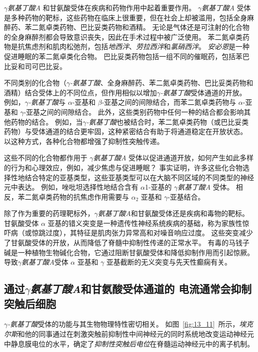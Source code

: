 \textit{$\gamma$氨基丁酸A} 和甘氨酸受体在疾病和药物作用中起着重要作用。
\textit{$\gamma$氨基丁酸A} 受体是多种药物的靶标，这些药物在临床上很重要，但在社会上却被滥用，包括全身麻醉药、苯二氮卓类药物、巴比妥类药物和酒精。
无论是气体还是可注射的化合物的全身麻醉剂都会导致意识丧失，因此在手术过程中被广泛使用。
苯二氮卓类药物是抗焦虑剂和肌肉松弛剂，包括\textit{地西泮}、\textit{劳拉西泮}和\textit{氯硝西泮}。
\textit{安必恩}是一种促进睡眠的苯二氮卓类化合物。
巴比妥类药物包括一组不同的催眠药，包括苯巴比妥和司可巴比妥。


不同类别的化合物（\textit{$\gamma$-氨基丁酸}、全身麻醉药、苯二氮卓类药物、巴比妥类药物和酒精）结合受体上的不同位点，但作用相似以增加\textit{$\gamma$-氨基丁酸}受体通道的开放。
例如，\textit{$\gamma$-氨基丁酸}与 $\alpha$-亚基和 $\beta$-亚基之间的间隙结合，而苯二氮卓类药物与 $\alpha$-亚基和 $\gamma$-亚基之间的间隙结合。
此外，这些类别药物中任何一种的结合都会影响其他药物的结合。
例如，当\textit{$\gamma$-氨基丁酸}也被结合时，苯二氮卓类药物（或巴比妥类药物）与受体通道的结合更牢固，这种紧密结合有助于将通道稳定在开放状态。
以这种方式，各种化合物都增强了抑制性突触传递。


这些不同的化合物都作用于 \textit{$\gamma$氨基丁酸A} 受体以促进通道开放，如何产生如此多样的行为和心理效应，例如，减少焦虑与促进睡眠？
事实证明，许多这些化合物选择性地结合特定的亚基类型，这些亚基类型可以在大脑不同区域的不同类型的神经元中表达。
例如，唑吡坦选择性地结合含有 $\alpha$1-亚基的 \textit{$\gamma$氨基丁酸A} 受体。
相反，苯二氮卓类药物的抗焦虑作用需要与 $\alpha_2$ 亚基和 $\gamma$-亚基结合。


除了作为重要的药理靶标外，\textit{$\gamma$氨基丁酸A}和甘氨酸受体还是疾病和毒物的靶标。
甘氨酸受体 $\alpha$ 亚基的错义突变是一种遗传性神经系统疾病的基础，称为家族性惊吓病（或惊跳过度），其特征是肌肉张力异常高和对噪音响应过度。
这些突变减少了甘氨酸受体的开放，从而降低了脊髓中抑制性传递的正常水平。
有毒的马钱子碱是一种植物生物碱化合物，它通过阻断甘氨酸受体和降低抑制作用而引起惊厥。
导致\textit{$\gamma$氨基丁酸A}受体 $\alpha$ 亚基和 $\gamma$ 亚基截断的无义突变与先天性癫痫有关。



\subsection{通过\textit{$\gamma$氨基丁酸A}和甘氨酸受体通道的  电流通常会抑制突触后细胞}

\textit{$\gamma$-氨基丁酸}受体的功能与其生物物理特性密切相关。
如图~\ref{fig:13_11}~所示，\textit{埃克尔斯}和他的同事通过在刺激突触前抑制性中间神经元的同时系统地改变运动神经元中静息膜电位的水平，确定了\textit{抑制性突触后电位}在脊髓运动神经元中的离子机制。


